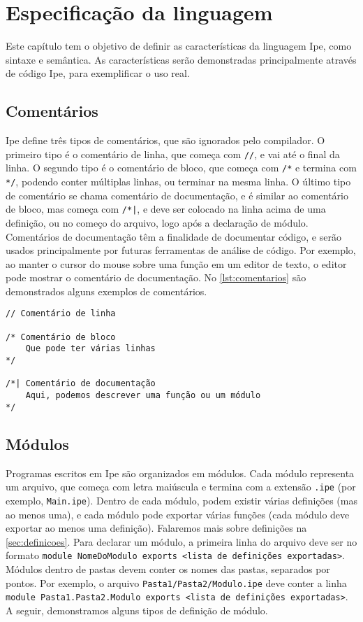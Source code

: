 
\chapter{Especificação da linguagem}\label{chapter:specification}

Este capítulo tem o objetivo de definir as características da linguagem Ipe, como
sintaxe e semântica. As características serão demonstradas principalmente através
de código Ipe, para exemplificar o uso real.

\section{Comentários}

Ipe define três tipos de comentários, que são ignorados pelo compilador. O primeiro
tipo é o comentário de linha, que começa com \texttt{//}, e vai até o final da linha.
O segundo tipo é o comentário de bloco, que começa com \texttt{/*} e termina com
\texttt{*/}, podendo conter múltiplas linhas, ou terminar na mesma linha. O último
tipo de comentário se chama comentário de documentação, e é similar ao comentário
de bloco, mas começa com \texttt{/*|}, e deve ser colocado na linha acima de uma
definição, ou no começo do arquivo, logo após a declaração de módulo. Comentários
de documentação têm a finalidade de documentar código, e serão usados principalmente por
futuras ferramentas de análise de código. Por exemplo, ao manter o cursor do
mouse sobre uma função em um editor de texto, o editor pode mostrar o comentário
de documentação. No \autoref{lst:comentarios} são demonstrados alguns exemplos
de comentários.

\begin{lstlisting}[label={lst:comentarios},caption={Exemplos de comentários}]
// Comentário de linha

/* Comentário de bloco
    Que pode ter várias linhas
*/

/*| Comentário de documentação
    Aqui, podemos descrever uma função ou um módulo 
*/
\end{lstlisting}

\section{Módulos}

Programas escritos em Ipe são organizados em módulos. Cada módulo representa um
arquivo, que começa com letra maiúscula e termina com a extensão \texttt{.ipe}
(por exemplo, \texttt{Main.ipe}). Dentro de cada módulo, podem existir várias
definições (mas ao menos uma), e cada módulo pode exportar várias funções (cada módulo
deve exportar ao menos uma definição). Falaremos mais sobre definições na
\autoref{sec:definicoes}. Para declarar um módulo, a primeira linha do arquivo deve
ser no formato \texttt{module NomeDoModulo exports <lista de definições exportadas>}.
Módulos dentro de pastas devem conter os nomes das pastas, separados por pontos.
Por exemplo, o arquivo \texttt{Pasta1/Pasta2/Modulo.ipe} deve conter a linha
\texttt{module Pasta1.Pasta2.Modulo exports <lista de definições exportadas>}.
A seguir, demonstramos alguns tipos de definição de módulo.

